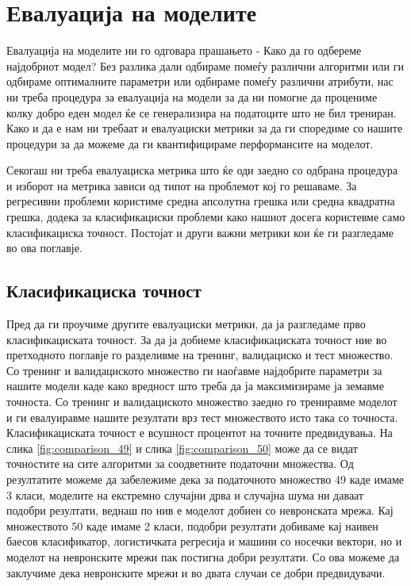 \chapter{Евалуација на моделите}
\label{sec:evaluation}
Евалуација на моделите ни го одговара прашањето - Како да го одбереме најдобриот модел? Без разлика дали одбираме помеѓу различни алгоритми или ги одбираме оптималните параметри или одбираме помеѓу различни атрибути, нас ни треба процедура за евалуација на модели за да ни помогне да процениме колку добро еден модел ќе се генерализира на податоците што не бил трениран. Како и да е нам ни требаат и евалуациски метрики за да ги споредиме со нашите процедури за да можеме да ги квантифицираме перформансите на моделот.

Секогаш ни треба евалуациска метрика што ќе оди заедно со одбрана процедура и изборот на метрика зависи од типот на проблемот кој го решаваме. За регресивни проблеми користиме средна апсолутна грешка или средна квадратна грешка, додека за класификациски проблеми како нашиот досега користевме само класификациска точност. Постојат и други важни метрики кои ќе ги разгледаме во ова поглавје. 
\section{Класификациска точност}
Пред да ги проучиме другите евалуациски метрики, да ја разгледаме прво класификациската точност. За да ја добиеме класификациската точност ние во претходното поглавје го разделивме на тренинг, валидациско и тест множество. Со тренинг и валидациското множество ги наоѓавме најдобрите параметри за нашите модели каде како вредност што треба да ја максимизираме ја земавме точноста. Со тренинг и валидациското множество заедно го трениравме моделот и ги евалуиравме нашите резултати врз тест множеството исто така со точноста. Класификациската точност е всушност процентот на точните предвидувања. На слика \ref{fig:comparison_49} и слика \ref{fig:comparison_50} може да се видат точностите на сите алгоритми за соодветните податочни множества. Од резултатите можеме да забележиме дека за податочното множество 49 каде имаме 3 класи, моделите на екстремно случајни дрва и случајна шума ни даваат подобри резултати, веднаш по нив е моделот добиен со невронската мрежа. Кај множеството 50 каде имаме 2 класи, подобри резултати добиваме кај наивен баесов класификатор, логистичката регресија и машини со носечки вектори, но и моделот на невронските мрежи пак постигна добри резултати. Со ова можеме да заклучиме дека невронските мрежи и во двата случаи се добри предвидувачи.

